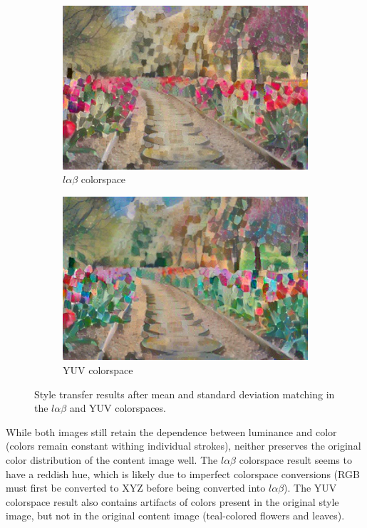 \documentclass[10pt,twocolumn,letterpaper]{article}
\begin{document}
\begin{figure}[ht]
\centering
\begin{subfigure}[b]{0.48\linewidth}
  \centering
  \includegraphics[width=\linewidth]{imgs/flowers-lab-lin.jpg}
  \caption{$l\alpha\beta$ colorspace}
\end{subfigure}
\quad
\begin{subfigure}[b]{0.48\linewidth}
  \centering
  \includegraphics[width=\linewidth]{imgs/flowers-ycbcr-lin.jpg}
  \caption{YUV colorspace}
\end{subfigure}
\caption{Style transfer results after mean and standard deviation matching in the $l\alpha\beta$ and YUV colorspaces.}
\label{fig:color-result}
\end{figure}

While both images still retain the dependence between luminance and color (colors remain constant withing individual strokes), neither preserves the original color distribution of the content image well. The $l\alpha\beta$ colorspace result seems to have a reddish hue, which is likely due to imperfect colorspace conversions (RGB must first be converted to XYZ before being converted into $l\alpha\beta$). The YUV colorspace result also contains artifacts of colors present in the original style image, but not in the original content image (teal-colored flowers and leaves).
\end{document}
